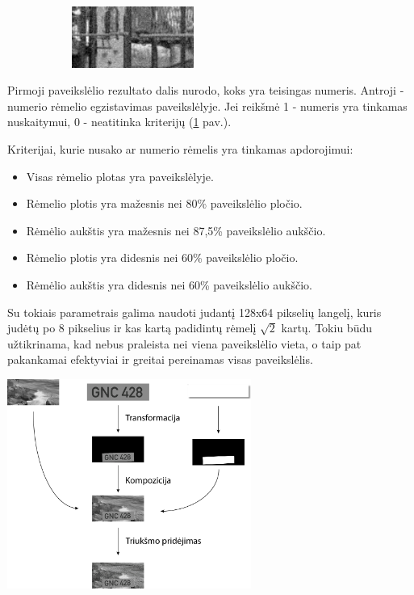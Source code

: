 \documentclass{VUMIFInfBakalaurinis}
\begin{document}
\begin{figure}[ht!]
\begin{subfigure}{\linewidth}
  \centering
  \includegraphics[width=4cm]{train_images/0_not_present.png}
\end{subfigure}
\label{img_ex}
\end{figure}
Pirmoji paveikslėlio rezultato dalis nurodo, koks yra teisingas numeris. Antroji - numerio rėmelio egzistavimas paveikslėlyje.
Jei reikšmė 1 - numeris yra tinkamas nuskaitymui, 0 - neatitinka kriterijų (\ref{img_ex} pav.). 

Kriterijai, kurie nusako ar numerio rėmelis yra tinkamas apdorojimui:

\begin{itemize}[itemsep=0.5pt]
  \item Visas rėmelio plotas yra paveikslėlyje.
  \item Rėmelio plotis yra mažesnis nei 80\% paveikslėlio pločio.
  \item Rėmėlio aukštis yra mažesnis nei 87,5\% paveikslėlio aukščio.
  \item Rėmelio plotis yra didesnis nei 60\% paveikslėlio pločio.
  \item Rėmėlio aukštis yra didesnis nei 60\% paveikslėlio aukščio.
\end{itemize}

Su tokiais parametrais galima naudoti judantį 128x64 pikselių langelį, kuris judėtų po 8 pikselius ir kas kartą padidintų rėmelį
\begin{math}
  \sqrt{2}
\end{math}
kartų. Tokiu būdu užtikrinama, kad nebus praleista nei viena paveikslėlio vieta, o taip pat pakankamai efektyviai ir greitai pereinamas
visas paveikslėlis.

\begin{minipage}{\linewidth}
  \centering
  \includegraphics[width=8cm]{train_images/generating.png}
  \label{gen_img}
\end{minipage}
\end{document}
